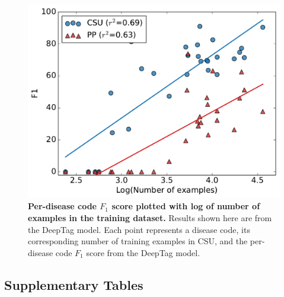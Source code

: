 \documentclass[fleqn,10pt]{wlscirep}
\begin{document}
\begin{figure}[!h]
\centering
\includegraphics[scale=0.4]{example_f1_scatterplot.pdf}
\caption{{\bf Per-disease code $F_1$ score plotted with log of number of examples in the training dataset.} Results shown here are from the DeepTag model. Each point represents a disease code, its corresponding number of training examples in CSU, and the per-disease code $F_1$ score from the DeepTag model.
}
\label{fig:example-f1-scatterplot}
\end{figure}

\clearpage

\subsection*{Supplementary Tables}
\end{document}
